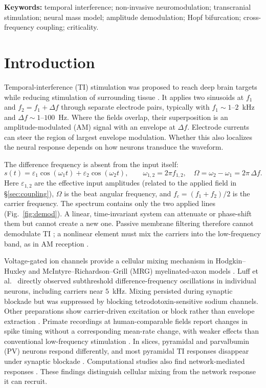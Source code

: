 \documentclass[11pt,a4paper]{article}
\begin{document}
\smallskip
\noindent\textbf{Keywords:} temporal interference; non-invasive neuromodulation;
transcranial stimulation; neural mass model; amplitude demodulation; Hopf bifurcation;
cross-frequency coupling; criticality.

\clearpage
\tableofcontents
\clearpage

\section{Introduction}
Temporal-interference (TI) stimulation was proposed to reach deep brain targets while
reducing stimulation of surrounding tissue \cite{grossman2017}. It applies two sinusoids at
$f_1$ and $f_2=f_1+\Delta f$ through separate electrode pairs, typically with
$f_1\sim1$--$2$~kHz and $\Delta f\sim1$--$100$~Hz. Where the fields overlap, their
superposition is an amplitude-modulated (AM) signal with an envelope at $\Delta f$.
Electrode currents can steer the region of largest envelope modulation. Whether this
also localizes the neural response depends on how neurons transduce the waveform.

The difference frequency is absent from the input itself:
\begin{equation}
s(t)=\varepsilon_1\cos(\omega_1 t)+\varepsilon_2\cos(\omega_2 t),\qquad
\omega_{1,2}=2\pi f_{1,2},\quad \Omega=\omega_2-\omega_1=2\pi\,\Delta f .
\label{eq:am}
\end{equation}
Here $\varepsilon_{1,2}$ are the effective input amplitudes (related to the applied field
in \S\ref{sec:coupling}), $\Omega$ is the beat angular frequency, and
$f_c=(f_1+f_2)/2$ is the carrier frequency. The spectrum contains only the two applied
lines (Fig.~\ref{fig:demod}). A linear, time-invariant system can attenuate or phase-shift
them but cannot create a new one. Passive membrane filtering therefore cannot
demodulate TI \cite{mirzakhalili2020}; a nonlinear element must mix the carriers into
the low-frequency band, as in AM reception \cite{nahin2001}.

Voltage-gated ion channels provide a cellular mixing mechanism in Hodgkin--Huxley
and McIntyre--Richardson--Grill (MRG) myelinated-axon models \cite{mirzakhalili2020}.
Luff et al.\ \cite{luff2024mixer} directly observed subthreshold difference-frequency
oscillations in individual neurons, including carriers near $5$~kHz. Mixing persisted
during synaptic blockade but was suppressed by blocking tetrodotoxin-sensitive sodium
channels. Other preparations show carrier-driven excitation or block rather than
envelope extraction \cite{opancar2025,peripheral2023,semenov2025}. Primate recordings at
human-comparable fields report changes in spike timing without a corresponding
mean-rate change, with weaker effects than conventional low-frequency stimulation
\cite{vieira2024}. In slices, pyramidal and parvalbumin (PV) neurons respond differently,
and most pyramidal TI responses disappear under synaptic blockade \cite{caldas2024}.
Computational studies also find network-mediated responses
\cite{karimi2024,soroushi2025,wangw2026}. These findings distinguish cellular mixing from
the network response it can recruit.
\end{document}
